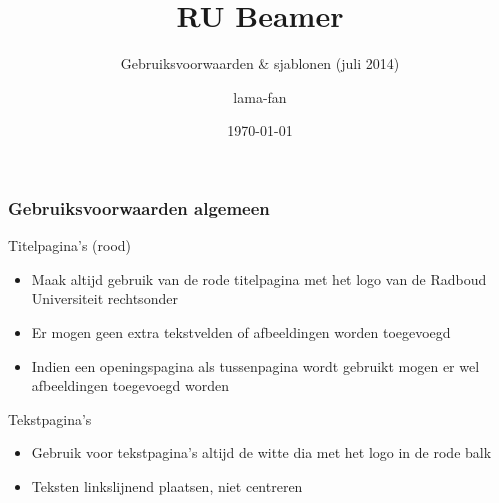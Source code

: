 \documentclass[xcolor=table,10pt,t]{beamer}
\title{RU Beamer}
\subtitle{Gebruiksvoorwaarden \& sjablonen (juli 2014)}
\date{\today}
\author{lama-fan}
\begin{document}
\begin{frame}
    \titlepage
\end{frame}

\begin{frame}
    \frametitle{Gebruiksvoorwaarden algemeen}

    \begin{block}{Titelpagina's (rood)}
        \begin{itemize}
            \item Maak altijd gebruik van de rode titelpagina met het logo van de Radboud Universiteit rechtsonder
            \item Er mogen geen extra tekstvelden of afbeeldingen worden toegevoegd
            \item Indien een openingspagina als tussenpagina wordt gebruikt mogen er wel afbeeldingen toegevoegd worden
        \end{itemize}
    \end{block}

    \begin{block}{Tekstpagina's}
        \begin{itemize}
            \item Gebruik voor tekstpagina's altijd de witte dia met het logo in de rode balk
            \item Teksten linkslijnend plaatsen, niet centreren
        \end{itemize}
    \end{block}
\end{frame} 
\end{document}
